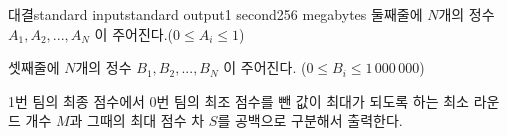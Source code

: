 \begin{problem}{대결}{standard input}{standard output}{1 second}{256 megabytes}
둘째줄에 $N$개의 정수 $A_1, A_2, ..., A_N$ 이 주어진다.($0 \le A_i \le 1$)

셋째줄에 $N$개의 정수 $B_1, B_2, ..., B_N$ 이 주어진다. ($0 \le B_i \le 1\,000\,000$)


\OutputFile
1번 팀의 최종 점수에서 0번 팀의 최조 점수를 뺀 값이 최대가 되도록 하는 최소 라운드 개수 $M$과 그때의 최대 점수 차 $S$를 공백으로 구분해서 출력한다.

\Examples

\begin{example}
%
%
\end{example}

\end{problem}

